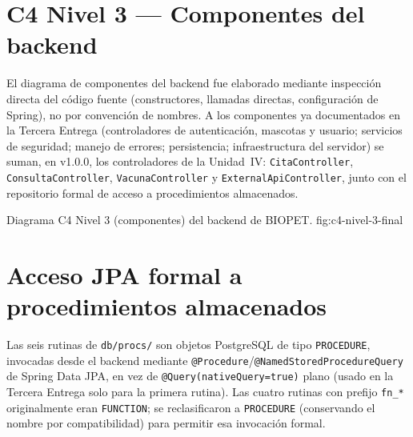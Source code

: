 \section{C4 Nivel 3 --- Componentes del backend}
\label{sec:c4-nivel-3}

El diagrama de componentes del backend fue elaborado mediante inspecci\'on
directa del c\'odigo fuente (constructores, llamadas directas,
configuraci\'on de Spring), no por convenci\'on de nombres. A los
componentes ya documentados en la Tercera Entrega (controladores de
autenticaci\'on, mascotas y usuario; servicios de seguridad; manejo de
errores; persistencia; infraestructura del servidor) se suman, en v1.0.0,
los controladores de la Unidad~IV: \texttt{CitaController},
\texttt{ConsultaController}, \texttt{VacunaController} y
\texttt{ExternalApiController}, junto con el repositorio formal de acceso a
procedimientos almacenados.

%
{Diagrama C4 Nivel 3 (componentes) del backend de BIOPET.}%
{fig:c4-nivel-3-final}

\section{Acceso JPA formal a procedimientos almacenados}
\label{sec:acceso-jpa-formal}

Las seis rutinas de \texttt{db/procs/} son objetos PostgreSQL de tipo
\texttt{PROCEDURE}, invocadas desde el backend mediante
\texttt{@Procedure}/\texttt{@NamedStoredProcedureQuery} de Spring Data JPA,
en vez de \texttt{@Query(nativeQuery=true)} plano (usado en la Tercera
Entrega solo para la primera rutina). Las cuatro rutinas con prefijo
\texttt{fn\_*} originalmente eran \texttt{FUNCTION}; se reclasificaron a
\texttt{PROCEDURE} (conservando el nombre por compatibilidad) para permitir
esa invocaci\'on formal.

